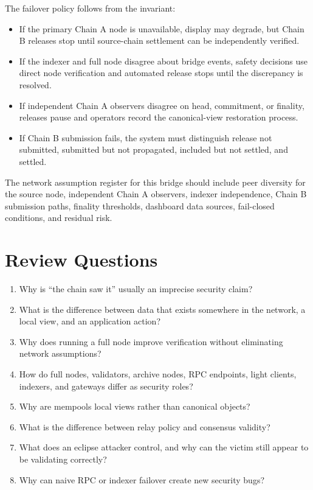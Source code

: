 The failover policy follows from the invariant:

\begin{itemize}
\item If the primary Chain A node is unavailable, display may degrade, but Chain B releases stop until source-chain settlement can be independently verified.
\item If the indexer and full node disagree about bridge events, safety decisions use direct node verification and automated release stops until the discrepancy is resolved.
\item If independent Chain A observers disagree on head, commitment, or finality, releases pause and operators record the canonical-view restoration process.
\item If Chain B submission fails, the system must distinguish release not submitted, submitted but not propagated, included but not settled, and settled.
\end{itemize}

The network assumption register for this bridge should include peer diversity for the source node, independent Chain A observers, indexer independence, Chain B submission paths, finality thresholds, dashboard data sources, fail-closed conditions, and residual risk.

\section*{Review Questions}

\begin{enumerate}
\item Why is ``the chain saw it'' usually an imprecise security claim?
\item What is the difference between data that exists somewhere in the network, a local view, and an application action?
\item Why does running a full node improve verification without eliminating network assumptions?
\item How do full nodes, validators, archive nodes, RPC endpoints, light clients, indexers, and gateways differ as security roles?
\item Why are mempools local views rather than canonical objects?
\item What is the difference between relay policy and consensus validity?
\item What does an eclipse attacker control, and why can the victim still appear to be validating correctly?
\item Why can naive RPC or indexer failover create new security bugs?
\end{enumerate}

